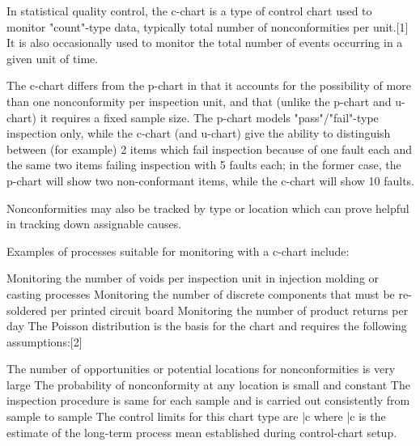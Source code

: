 In statistical quality control, the c-chart is a type of control chart used to monitor "count"-type data, typically total number of nonconformities per unit.[1] It is also occasionally used to monitor the total number of events occurring in a given unit of time.

The c-chart differs from the p-chart in that it accounts for the possibility of more than one nonconformity per inspection unit, and that (unlike the p-chart and u-chart) it requires a fixed sample size. The p-chart models "pass"/"fail"-type inspection only, while the c-chart (and u-chart) give the ability to distinguish between (for example) 2 items which fail inspection because of one fault each and the same two items failing inspection with 5 faults each; in the former case, the p-chart will show two non-conformant items, while the c-chart will show 10 faults.

Nonconformities may also be tracked by type or location which can prove helpful in tracking down assignable causes.

Examples of processes suitable for monitoring with a c-chart include:

Monitoring the number of voids per inspection unit in injection molding or casting processes
Monitoring the number of discrete components that must be re-soldered per printed circuit board
Monitoring the number of product returns per day
The Poisson distribution is the basis for the chart and requires the following assumptions:[2]

The number of opportunities or potential locations for nonconformities is very large
The probability of nonconformity at any location is small and constant
The inspection procedure is same for each sample and is carried out consistently from sample to sample
The control limits for this chart type are \bar c  where \bar c is the estimate of the long-term process mean established during control-chart setup.
